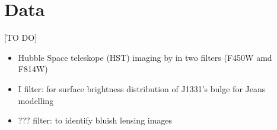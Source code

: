 \section{Data}

[TO DO]

\begin{itemize}
\item Hubble Space teleskope (HST) imaging by \cite{SWELLSI} in two filters (F450W amd F814W)
\item I filter: for surface brightness distribution of J1331's bulge for Jeans modelling
\item ??? filter: to identify bluish lensing images
\end{itemize}